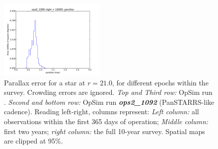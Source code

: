 \begin{figure}[ht]
\begin{center}
  \includegraphics[width=2.0in]{./figs/milkyway/MW_Astrom_paError_1092_10y_hst.pdf}
  \end{center}
  \caption{Parallax error for a star at $r=21.0$, for different epochs within the survey. Crowding errors are ignored. {\it Top and Third row:} OpSim run . {\it Second and bottom row:} OpSim run {\it \bf ops2\_1092} (PanSTARRS-like cadence). Reading left-right, columns represent: {\it Left column:} all observations within the first 365 days of operation; {\it Middle column:} first two years; {\it right column:} the full 10-year survey. Spatial maps are clipped at 95\%.}
  \label{fig_astrom_ByTime_paError}
\end{figure}

